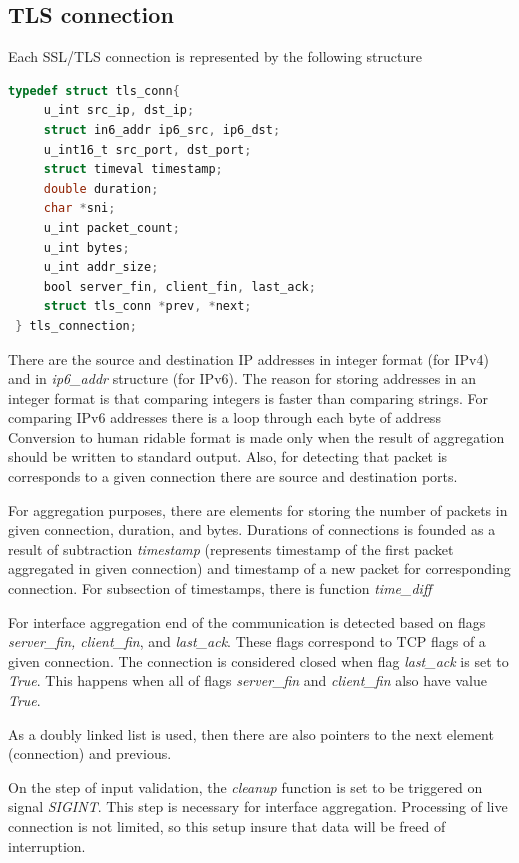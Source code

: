 \documentclass[12pt,a4paper]{article}
\begin{document}
    \subsection{TLS connection}
    Each SSL/TLS connection is represented by the following structure
    \begin{lstlisting}[language=C]
 typedef struct tls_conn{
     u_int src_ip, dst_ip;
     struct in6_addr ip6_src, ip6_dst;
     u_int16_t src_port, dst_port;
     struct timeval timestamp;
     double duration;
     char *sni;
     u_int packet_count;
     u_int bytes;
     u_int addr_size;
     bool server_fin, client_fin, last_ack;
     struct tls_conn *prev, *next;
 } tls_connection;
\end{lstlisting}

    There are the source and destination IP addresses in integer format (for IPv4) 
    and in \textit{ip6\_addr} structure (for IPv6). 
    The reason for storing addresses in an integer format is that comparing integers
    is faster than comparing strings. For comparing IPv6 addresses there is a loop 
    through each byte of address Conversion to human ridable format is 
    made only when the result of aggregation should be written to standard output. 
    Also, for detecting that packet is corresponds to a given connection there 
    are source and destination ports. 

    For aggregation purposes, there are elements for storing the number of packets
    in given connection, duration, and bytes. Durations of connections is founded 
    as a result of subtraction \textit{timestamp} (represents timestamp of the first 
    packet aggregated in given connection) and timestamp of a new packet for 
    corresponding connection. For subsection of timestamps, there is function 
    \textit{time\_diff} 

    For interface aggregation end of the communication is detected based on flags 
    \textit{server\_fin, client\_fin}, and \textit{last\_ack}. These flags correspond 
    to TCP flags of a given connection. The connection is considered closed when 
    flag \textit{last\_ack} is set to \textit{True}. This happens when all of 
    flags \textit{server\_fin} and \textit{client\_fin} also have value \textit{True}. 

    As a doubly linked list is used, then there are also pointers to the next 
    element (connection) and previous. 

    On the step of input validation, the \textit{cleanup} function is set to be 
    triggered on signal \textit{SIGINT}. This step is necessary for interface 
    aggregation. Processing of live connection is not limited, so this setup 
    insure that data will be freed of interruption.
\end{document}
